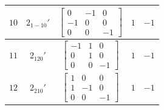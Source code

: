 \documentclass[fleqn,8pt]{jsarticle}
\begin{document}
\begin{longtable}{ccccc}
$ 10 $ & $ 2{}_{1-10}{}' $ & $ \begin{bmatrix} 0 & -1 & 0 \\ -1 & 0 & 0 \\ 0 & 0 & -1 \end{bmatrix} $ & $ 1 $ & $ -1 $ \\ \hline
$ 11 $ & $ 2{}_{120}{}' $ & $ \begin{bmatrix} -1 & 1 & 0 \\ 0 & 1 & 0 \\ 0 & 0 & -1 \end{bmatrix} $ & $ 1 $ & $ -1 $ \\ \hline
$ 12 $ & $ 2{}_{210}{}' $ & $ \begin{bmatrix} 1 & 0 & 0 \\ 1 & -1 & 0 \\ 0 & 0 & -1 \end{bmatrix} $ & $ 1 $ & $ -1 $ \\
\end{longtable}
\end{document}
